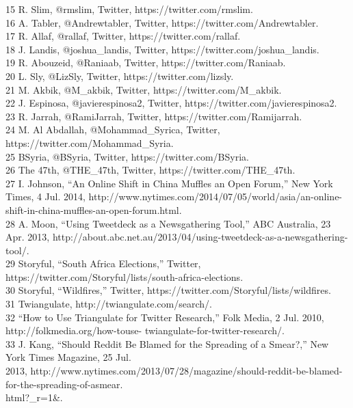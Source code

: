 15 R. Slim, @rmslim, Twitter, https://twitter.com/rmslim.\\
16 A. Tabler, @Andrewtabler, Twitter, https://twitter.com/Andrewtabler.\\
17 R. Allaf, @rallaf, Twitter, https://twitter.com/rallaf.\\
18 J. Landis, @joshua_landis, Twitter, https://twitter.com/joshua_landis.\\
19 R. Abouzeid, @Raniaab, Twitter, https://twitter.com/Raniaab.\\
20 L. Sly, @LizSly, Twitter, https://twitter.com/lizsly.\\
21 M. Akbik, @M_akbik, Twitter, https://twitter.com/M_akbik.\\
22 J. Espinosa, @javierespinosa2, Twitter, https://twitter.com/javierespinosa2.\\
23 R. Jarrah, @RamiJarrah, Twitter, https://twitter.com/Ramijarrah.\\
24 M. Al Abdallah, @Mohammad_Syrica, Twitter, https://twitter.com/Mohammad_Syria.\\
25 BSyria, @BSyria, Twitter, https://twitter.com/BSyria.\\
26 The 47th, @THE_47th, Twitter, https://twitter.com/THE_47th.\\
27 I. Johnson, ``An Online Shift in China Muffles an Open Forum,'' New York Times, 4 Jul. 2014,
http://www.nytimes.com/2014/07/05/world/asia/an-online-shift-in-china-muffles-an-open-forum.html.\\
28 A. Moon, ``Using Tweetdeck as a Newsgathering Tool,'' ABC Australia, 23 Apr. 2013,
http://about.abc.net.au/2013/04/using-tweetdeck-as-a-newsgathering-tool/.\\
29 Storyful, ``South Africa Elections,'' Twitter, https://twitter.com/Storyful/lists/south-africa-elections.\\
30 Storyful, ``Wildfires,'' Twitter, https://twitter.com/Storyful/lists/wildfires.\\
31 Twiangulate, http://twiangulate.com/search/.\\
32 ``How to Use Triangulate for Twitter Research,'' Folk Media, 2 Jul. 2010, http://folkmedia.org/how-touse-
twiangulate-for-twitter-research/.\\
33 J. Kang, ``Should Reddit Be Blamed for the Spreading of a Smear?,'' New York Times Magazine, 25 Jul.\\
2013, http://www.nytimes.com/2013/07/28/magazine/should-reddit-be-blamed-for-the-spreading-of-asmear.\\
html?_r=1&.\\
